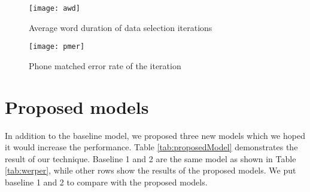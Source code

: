 \begin{figure}
\caption{Average word duration of data selection iterations}
\label{awd}
\texttt{[image: awd]} 
\centering
\end{figure}

\begin{figure}
\caption{Phone matched error rate of the iteration}
\label{pmer}
\texttt{[image: pmer]} 
\centering
\end{figure}




\section{Proposed models}

In addition to the baseline model, we proposed three new models which we hoped it would increase the performance. Table \ref{tab:proposedModel} demonstrates the result of our technique. Baseline 1 and 2 are the same model as shown in Table \ref{tab:werper}, while other rows show the results of the proposed models.  We put baseline 1 and 2 to compare with the proposed models.

